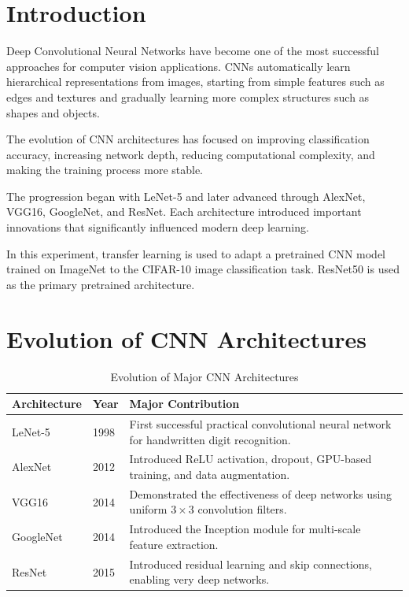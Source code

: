 \documentclass[12pt,a4paper]{article}
\begin{document}

\section{Introduction}

Deep Convolutional Neural Networks have become one of the most successful approaches for computer vision applications. CNNs automatically learn hierarchical representations from images, starting from simple features such as edges and textures and gradually learning more complex structures such as shapes and objects.

The evolution of CNN architectures has focused on improving classification accuracy, increasing network depth, reducing computational complexity, and making the training process more stable.

The progression began with LeNet-5 and later advanced through AlexNet, VGG16, GoogleNet, and ResNet. Each architecture introduced important innovations that significantly influenced modern deep learning.

In this experiment, transfer learning is used to adapt a pretrained CNN model trained on ImageNet to the CIFAR-10 image classification task. ResNet50 is used as the primary pretrained architecture.


\section{Evolution of CNN Architectures}

\begin{table}[H]
\centering
\caption{Evolution of Major CNN Architectures}
\begin{tabular}{p{3cm}p{1.5cm}p{8cm}}
\toprule
\textbf{Architecture} & \textbf{Year} & \textbf{Major Contribution} \\
\midrule
LeNet-5 & 1998 & First successful practical convolutional neural network for handwritten digit recognition. \\
AlexNet & 2012 & Introduced ReLU activation, dropout, GPU-based training, and data augmentation. \\
VGG16 & 2014 & Demonstrated the effectiveness of deep networks using uniform $3\times3$ convolution filters. \\
GoogleNet & 2014 & Introduced the Inception module for multi-scale feature extraction. \\
ResNet & 2015 & Introduced residual learning and skip connections, enabling very deep networks. \\
\bottomrule
\end{tabular}
\end{table}
\end{document}
